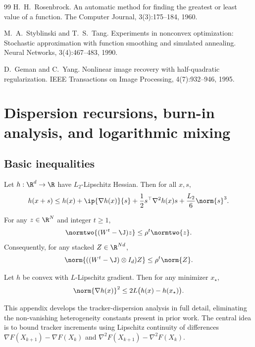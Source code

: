 \documentclass[review,onefignum,onetabnum]{siamart171218}
\begin{document}
\begin{thebibliography}{99}
		H.~H.~Rosenbrock.
		\newblock An automatic method for finding the greatest or least value of a function.
		\newblock The Computer Journal, 3(3):175--184, 1960.

		M.~A.~Styblinski and T.~S.~Tang.
		\newblock Experiments in nonconvex optimization: Stochastic approximation with function smoothing and simulated annealing.
		\newblock Neural Networks, 3(4):467--483, 1990.

		D.~Geman and C.~Yang.
		\newblock Nonlinear image recovery with half-quadratic regularization.
		\newblock IEEE Transactions on Image Processing, 4(7):932--946, 1995.

	\end{thebibliography}

\appendix

\section{Dispersion recursions, burn-in analysis, and logarithmic mixing}\label{app:dispersion}

\subsection{Basic inequalities}\label{ssec:basic}
\begin{lemma}\label{lem:taylor3}
Let $h:\R^d\to\R$ have $L_2$-Lipschitz Hessian. Then for all $x,s$,
\[
h(x+s)\le h(x)+\ip{\nabla h(x)}{s}+\frac12 s^\top\nabla^2 h(x)s+\frac{L_2}{6}\norm{s}^3.
\]
\end{lemma}

\begin{lemma}\label{lem:consensus}
For any $z\in\R^N$ and integer $t\ge 1$,
\[
\normtwo{(W^t-\J)z}\le \rho^t\normtwo{z}.
\]
Consequently, for any stacked $Z\in\R^{Nd}$,
\[
\norm{((W^t-\J)\otimes I_d)Z}\le \rho^t\norm{Z}.
\]
\end{lemma}

\begin{lemma}\label{lem:gap-grad}
Let $h$ be convex with $L$-Lipschitz gradient. Then for any minimizer $x_\star$,
\[
\norm{\nabla h(x)}^2\le 2L\big(h(x)-h(x_\star)\big).
\]
\end{lemma}

This appendix develops the tracker-dispersion analysis in full detail,
eliminating the non-vanishing heterogeneity constants present in prior
work.
The central idea is to bound tracker increments using Lipschitz
continuity of differences
$\nabla F(X_{k+1})-\nabla F(X_k)$ and
$\nabla^2F(X_{k+1})-\nabla^2F(X_k)$.
\end{document}
